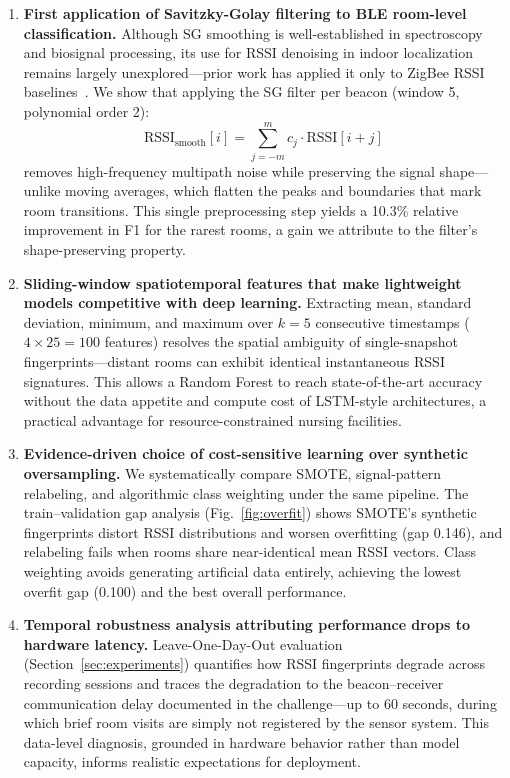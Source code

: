\documentclass{iopconfser}
\begin{document}
\begin{enumerate}
    \item \textbf{First application of Savitzky-Golay filtering to BLE room-level classification.} Although SG smoothing is well-established in spectroscopy and biosignal processing, its use for RSSI denoising in indoor localization remains largely unexplored---prior work has applied it only to ZigBee RSSI baselines~\cite{halder2015}. We show that applying the SG filter per beacon (window 5, polynomial order 2):
    \begin{equation}
    \text{RSSI}_{\text{smooth}}[i] = \sum_{j = -m}^{m} c_j \cdot \text{RSSI}[i + j]
    \label{eq:sg}
    \end{equation}
    \noindent removes high-frequency multipath noise while preserving the signal shape---unlike moving averages, which flatten the peaks and boundaries that mark room transitions. This single preprocessing step yields a 10.3\% relative improvement in F1 for the rarest rooms, a gain we attribute to the filter's shape-preserving property.

    \item \textbf{Sliding-window spatiotemporal features that make lightweight models competitive with deep learning.} Extracting mean, standard deviation, minimum, and maximum over $k = 5$ consecutive timestamps ($4 \times 25 = 100$ features) resolves the spatial ambiguity of single-snapshot fingerprints---distant rooms can exhibit identical instantaneous RSSI signatures. This allows a Random Forest to reach state-of-the-art accuracy without the data appetite and compute cost of LSTM-style architectures, a practical advantage for resource-constrained nursing facilities.

    \item \textbf{Evidence-driven choice of cost-sensitive learning over synthetic oversampling.} We systematically compare SMOTE, signal-pattern relabeling, and algorithmic class weighting under the same pipeline. The train--validation gap analysis (Fig.~\ref{fig:overfit}) shows SMOTE's synthetic fingerprints distort RSSI distributions and worsen overfitting (gap 0.146), and relabeling fails when rooms share near-identical mean RSSI vectors. Class weighting avoids generating artificial data entirely, achieving the lowest overfit gap (0.100) and the best overall performance.

    \item \textbf{Temporal robustness analysis attributing performance drops to hardware latency.} Leave-One-Day-Out evaluation (Section~\ref{sec:experiments}) quantifies how RSSI fingerprints degrade across recording sessions and traces the degradation to the beacon--receiver communication delay documented in the challenge---up to 60 seconds, during which brief room visits are simply not registered by the sensor system. This data-level diagnosis, grounded in hardware behavior rather than model capacity, informs realistic expectations for deployment.
\end{enumerate}
\end{document}
